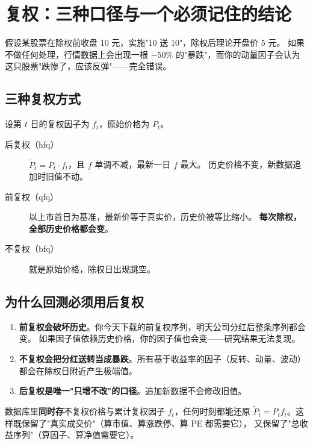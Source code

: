 \section{复权：三种口径与一个必须记住的结论}

假设某股票在除权前收盘 10 元，实施"10 送 10"，除权后理论开盘价 5 元。
如果不做任何处理，行情数据上会出现一根 $-50\%$ 的"暴跌"，而你的动量因子会认为
这只股票"跌惨了，应该反弹"——完全错误。

\subsection{三种复权方式}

设第 $t$ 日的复权因子为 $f_t$，原始价格为 $P_t$。

\begin{description}
  \item[后复权（hfq）] $\tilde P_t = P_t \cdot f_t$，且 $f$ 单调不减，最新一日 $f$ 最大。
        历史价格不变，新数据追加时旧值不动。
  \item[前复权（qfq）] 以上市首日为基准，最新价等于真实价，历史价被等比缩小。
        \textbf{每次除权，全部历史价格都会变}。
  \item[不复权（bfq）] 就是原始价格，除权日出现跳空。
\end{description}

\subsection{为什么回测必须用后复权}

\begin{enumerate}
  \item \textbf{前复权会破坏历史}。你今天下载的前复权序列，明天公司分红后整条序列都会变。
        如果因子值依赖历史价格，你的因子值也会变——研究结果无法复现。
  \item \textbf{不复权会把分红送转当成暴跌}。所有基于收益率的因子（反转、动量、波动）
        都会在除权日附近产生极端值。
  \item \textbf{后复权是唯一"只增不改"的口径}。追加新数据不会修改旧值。
\end{enumerate}

\begin{keybox}[库表设计的对应做法]
数据库里\textbf{同时存}不复权价格与累计复权因子 $f_t$，任何时刻都能还原
$\tilde P_t = P_t f_t$。这样既保留了"真实成交价"（算市值、算涨跌停、算 PE 都需要它），
又保留了"总收益序列"（算因子、算净值需要它）。
\end{keybox}

